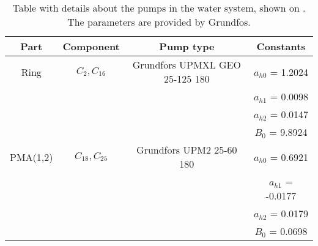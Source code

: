 \begin{table}[]
\centering
\begin{tabular}{c|c|c|c}
Part 	 & Component    		  & Pump type 					 	& Constants 	    \\ \hline
Ring     & $C_2,C_{16}$ 		  & Grundfors UPMXL GEO 25-125 180  & $a_{h0}$ = 1.2024 \\
		 &				 		  &								 	& $a_{h1}$ = 0.0098 \\
		 &						  &								 	& $a_{h2}$ = 0.0147 \\
		 &						  &								 	& $B_{0}$ = 9.8924  \\ \hline 
PMA(1,2) & $C_{18},C_{25}$ & Grundfors UPM2 25-60 180	    & $a_{h0}$ = 0.6921 \\
		 &				 		  &								 	& $a_{h1}$ = -0.0177\\
		 &						  &								 	& $a_{h2}$ = 0.0179 \\
		 &						  &								 	& $B_{0}$ = 0.0698  
\end{tabular}
\caption{Table with details about the pumps in the water system, shown on . The parameters are provided by Grundfos.}
\label{tab:pump_detail}
\end{table}
